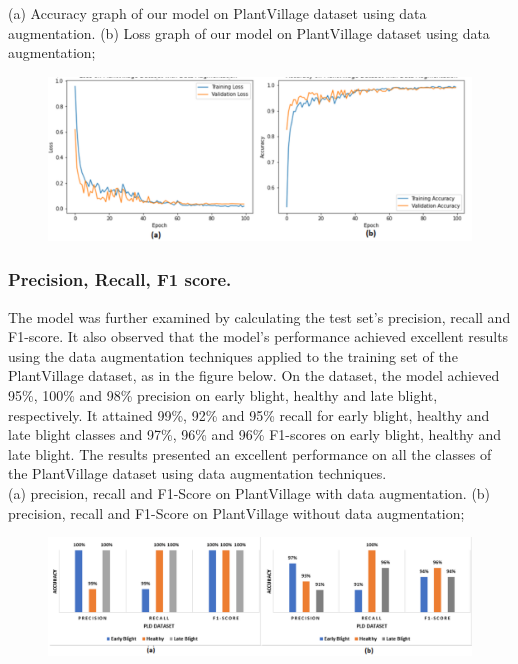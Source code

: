 \documentclass[11pt]{report}
\begin{document}
(a) Accuracy graph of our model on PlantVillage dataset using data augmentation. (b) Loss graph of our model on PlantVillage dataset using data augmentation;\\

\begin{figure}[h]
	\centerline{\small 
		\includegraphics[height=0.17\textheight]  {v2}}
\end{figure}

\subsubsection*{Precision, Recall, F1 score.}
The model was further examined by calculating the test set’s precision, recall
and F1-score. It also observed that the model’s performance achieved
excellent results using the data augmentation techniques applied to the training set of the
PlantVillage dataset, as in the figure below. On the dataset, the model achieved 95\%, 100\% and 98\% precision on early blight, healthy and late blight,
respectively. It attained 99\%, 92\% and 95\% recall for early blight, healthy and late blight
classes and 97\%, 96\% and 96\% F1-scores on early blight, healthy and late blight. The results
presented an excellent performance on all the classes of the PlantVillage dataset using data
augmentation techniques.\\

(a) precision, recall and F1-Score on PlantVillage with data augmentation.
(b) precision, recall and F1-Score on PlantVillage without data augmentation;\\

\begin{figure}[h]
	\centerline{\small 
		\includegraphics[height=0.17\textheight]  {v3}}
\end{figure}
\end{document}
